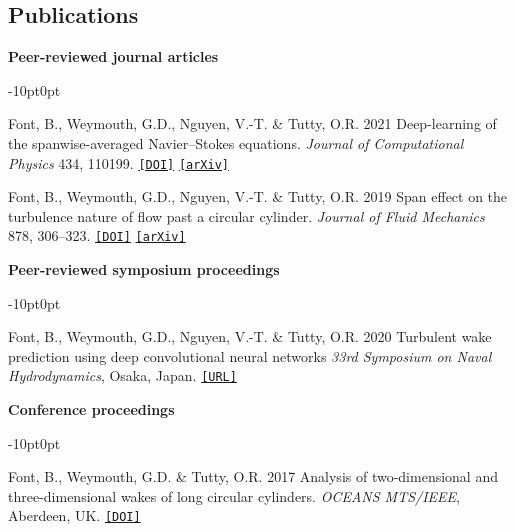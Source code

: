 \documentclass[line]{res}
\newenvironment{p}
  {\begin{adjustwidth}{-10pt}{0pt}}
  {\end{adjustwidth}}
\begin{document}
\begin{resume}
\section{Publications}
\vspace{0.25cm}
\hspace{-1cm}\textbf{Peer-reviewed journal articles}\vspace{0.25cm}
\begin{p}
\begin{etaremune}[leftmargin=-2pt,parsep=5pt]
\item Font, B., Weymouth, G.D., Nguyen, V.-T. \& Tutty, O.R. 2021 Deep-learning of the spanwise-averaged Navier--Stokes equations. \textit{Journal of Computational Physics} 434, 110199. \href{https://doi.org/10.1016/j.jcp.2021.110199}{\texttt{[DOI]}} \href{https://arxiv.org/abs/2008.07528}{\texttt{[arXiv]}}
\item Font, B., Weymouth, G.D., Nguyen, V.-T. \& Tutty, O.R. 2019 Span effect on the turbulence nature of flow past a circular cylinder. \textit{Journal of Fluid Mechanics} 878, 306--323. \href{https://doi.org/10.1017/jfm.2019.637}{\texttt{[DOI]}} \href{https://arxiv.org/abs/2008.08933}{\texttt{[arXiv]}}
\end{etaremune}
\end{p}

\hspace{-1cm}\textbf{Peer-reviewed symposium proceedings}\vspace{0.25cm}
\begin{p}
\begin{etaremune}[leftmargin=-2pt,parsep=5pt]
\item Font, B., Weymouth, G.D., Nguyen, V.-T. \& Tutty, O.R. 2020 Turbulent wake prediction using deep convolutional neural networks \textit{33rd Symposium on Naval Hydrodynamics}, Osaka, Japan. \href{https://eprints.soton.ac.uk/444591/}{\texttt{[URL]}}
\end{etaremune}
\end{p}

\hspace{-1cm}\textbf{Conference proceedings}\vspace{0.25cm}
\begin{p}
\begin{etaremune}[leftmargin=-2pt,parsep=5pt]
\item Font, B., Weymouth, G.D.  \&  Tutty, O.R. 2017 Analysis of two-dimensional and three-dimensional wakes of long circular cylinders. {\em OCEANS MTS/IEEE}, Aberdeen, UK. \href{https://doi.org/10.1109/OCEANSE.2017.8084904}{\texttt{[DOI]}}
\end{etaremune}
\end{p}


\end{resume}
\end{document}
